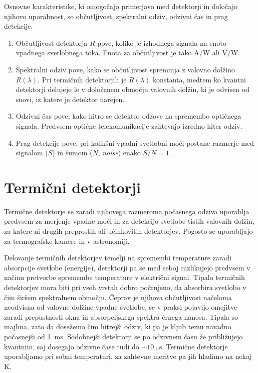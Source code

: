 Osnovne karakteristike, ki omogočajo primerjavo med detektorji in določajo njihovo uporabnost,
so občutljivost, spektralni odziv, odzivni čas in prag detekcije. 

\begin{enumerate}
\item Občutljivost detektorja $R$ pove, koliko je izhodnega signala 
na enoto vpadnega svetlobnega toka. Enota za občutljivost je tako A/W ali V/W. 
\item Spektralni odziv pove, kako se občutljivost spreminja z valovno dolžino $R(\lambda)$.
Pri termičnih detektorjih je $R(\lambda)$ konstanta, medtem ko kvantni detektorji 
delujejo le v določenem območju valovnih dolžin, ki je odvisen od snovi, 
iz katere je detektor narejen. 
\item Odzivni čas pove, kako hitro se detektor odzove na spremembo optičnega signala. Predvsem 
optične telekomunikacije zahtevajo izredno hiter odziv.
\item Prag detekcije pove, pri kolikšni vpadni svetlobni moči postane razmerje med signalom ($S$)
in šumom ($N$, {\it noise}) enako $S/N = 1$. 
\end{enumerate}

\section{Termični detektorji}
Termične detektorje se zaradi njihovega razmeroma počasnega odziva uporablja predvsem 
za merjenje vpadne moči in za detekcijo svetlobe tistih valovnih dolžin, za katere 
ni drugih preprostih ali učinkovitih detektorjev. Pogosto se uporabljajo za termografske 
kamere in v astronomiji.

Delovanje termičnih detektorjev temelji na spremembi temperature zaradi absorpcije svetlobe 
(energije), detektorji pa se med seboj razlikujejo predvsem v načinu pretvorbe spremembe 
temperature v električni signal.
Tipalo termičnih detektorjev mora biti pri vseh vrstah dobro počrnjeno, da absorbira
svetlobo v čim širšem spektralnem območju. Čeprav je njihova občutljivost načeloma 
neodvisna od valovne dolžine vpadne svetlobe, se v praksi pojavijo omejitve zaradi
prepustnosti okna in absorpcijskega spektra črnega nanosa. Tipala so majhna, zato 
da dosežemo čim hitrejši odziv, ki pa je kljub temu navadno počasnejši od 1~ms. Sodobnejši
detektorji se po odzivnem času že približujejo kvantnim, saj dosegajo odzivne čase tudi do
$\sim 10~\si{\micro\second}$. Termične detektorje uporabljamo pri sobni temperaturi, 
za zahtevne meritve pa jih hladimo na nekaj K. 


